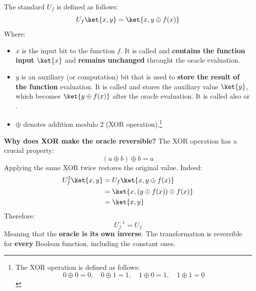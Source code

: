 \highspace
The standard  $U_f$ is defined as follows:
\begin{equation}
    U_f\ket{x, y} = \ket{x, y \oplus f(x)}
\end{equation}
Where:
\begin{itemize}
    \item $x$ is the input bit to the function $f$. It is called  and \textbf{contains the function input} $\ket{x}$ and \textbf{remains unchanged} throught the oracle evaluation.

    \item $y$ is an auxiliary (or computation) bit that is used to \textbf{store the result of the function} evaluation. It is called  and stores the auxiliary value $\ket{y}$, which becomes $\ket{y \oplus f(x)}$ after the oracle evaluation. It is called also  or .

    \item $\oplus$ denotes addition modulo 2 (XOR operation).\footnote{%
        The XOR operation is defined as follows:
        \begin{equation*}
            0 \oplus 0 = 0, \quad 0 \oplus 1 = 1, \quad 1 \oplus 0 = 1, \quad 1 \oplus 1 = 0
        \end{equation*}%
    }
\end{itemize}
\textcolor{Green3}{ \textbf{Why does XOR make the oracle reversible?}} The XOR operation has a crucial property:
\begin{equation*}
    \left(a \oplus b\right) \oplus b = a
\end{equation*}
Applying the same XOR twice restores the original value. Indeed:
\begin{align*}
    U_f^2 \ket{x,y} &= U_f \ket{x, y \oplus f(x)} \\
    &= \ket{x, (y \oplus f(x)) \oplus f(x)} \\
    &= \ket{x, y}
\end{align*}
Therefore:
\begin{equation*}
    U_f^{-1} = U_f
\end{equation*}
Meaning that the \textbf{oracle is its own inverse}. The transformation is reversible for \textbf{every} Boolean function, including the constant ones.

